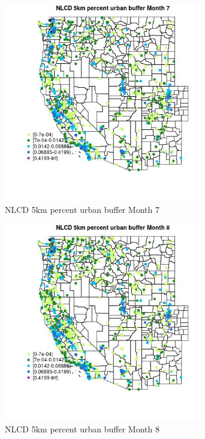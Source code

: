 \begin{figure} 
\centering  
\includegraphics[width=0.77\textwidth]{Code_Outputs/Report_ML_input_PM25_Step4_part_f_de_duplicated_aves_prioritize_24hr_obswNAs_MapObsMo7NLCD_5km_percent_urban_buffer.jpg} 
\caption{\label{fig:Report_ML_input_PM25_Step4_part_f_de_duplicated_aves_prioritize_24hr_obswNAsMapObsMo7NLCD_5km_percent_urban_buffer}NLCD 5km percent urban buffer Month 7} 
\end{figure} 
 

\begin{figure} 
\centering  
\includegraphics[width=0.77\textwidth]{Code_Outputs/Report_ML_input_PM25_Step4_part_f_de_duplicated_aves_prioritize_24hr_obswNAs_MapObsMo8NLCD_5km_percent_urban_buffer.jpg} 
\caption{\label{fig:Report_ML_input_PM25_Step4_part_f_de_duplicated_aves_prioritize_24hr_obswNAsMapObsMo8NLCD_5km_percent_urban_buffer}NLCD 5km percent urban buffer Month 8} 
\end{figure} 
 

